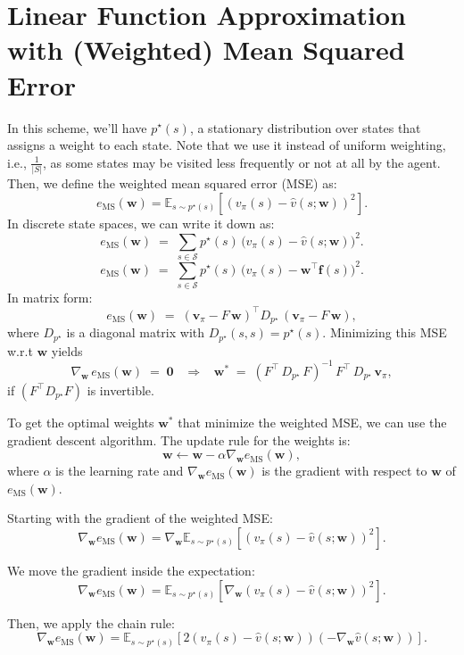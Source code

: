 \section{Linear Function Approximation with (Weighted) Mean Squared Error}

In this scheme, we'll have \(p^\star(s)\), a stationary distribution over states that assigns a weight to each state. Note that we use it instead of uniform weighting, i.e., \(\frac{1}{|S|}\), as some states may be visited less frequently or not at all by the agent. Then, we define the weighted mean squared error (MSE) as:
\[
e_{\text{MS}}(\mathbf{w}) 
= \mathbb{E}_{s \sim p^\star(s)}\left[\left(v_\pi(s) - \hat{v}(s;\mathbf{w})\right)^2\right].
\]
In discrete state spaces, we can write it down as:
\[
e_{\text{MS}}(\mathbf{w})
\;=\; \sum_{s \in \mathcal{S}} p^\star(s)\,\bigl(v_\pi(s) - \hat{v}(s;\mathbf{w})\bigr)^2.
\]
\[
e_{\text{MS}}(\mathbf{w})
\;=\; \sum_{s \in \mathcal{S}} p^\star(s)\,\bigl(v_\pi(s) - \mathbf{w}^\top \mathbf{f}(s)\bigr)^2.
\]
In matrix form:
\[
e_{\text{MS}}(\mathbf{w}) 
\;=\; (\mathbf{v}_\pi - F\,\mathbf{w})^\top D_{p^\star} \,(\mathbf{v}_\pi - F\,\mathbf{w}),
\]
where \(D_{p^\star}\) is a diagonal matrix with \(D_{p^\star}(s,s) = p^\star(s)\). Minimizing this MSE w.r.t \(\mathbf{w}\) yields
\[
\nabla_{\mathbf{w}}\, e_{\text{MS}}(\mathbf{w}) \;=\; \mathbf{0}
\;\;\;\Rightarrow\;\;\;
\mathbf{w}^*
\;=\; (F^\top\,D_{p^\star}\,F)^{-1}\,F^\top\,D_{p^\star}\,\mathbf{v}_\pi,
\]
if \((F^\top D_{p^\star} F)\) is invertible.

To get the optimal weights \(\mathbf{w}^*\) that minimize the weighted MSE, we can use the gradient descent algorithm. The update rule for the weights is:
\[
\mathbf{w} \leftarrow \mathbf{w} - \alpha \nabla_{\mathbf{w}} e_{\text{MS}}(\mathbf{w}),
\]
where \(\alpha\) is the learning rate and \(\nabla_{\mathbf{w}} e_{\text{MS}}(\mathbf{w})\) is the gradient with respect to \(\mathbf{w}\) of \(e_{\text{MS}}(\mathbf{w})\).

Starting with the gradient of the weighted MSE:
\[
\nabla_{\mathbf{w}} e_{\text{MS}}(\mathbf{w}) = \nabla_{\mathbf{w}} \mathbb{E}_{s \sim p^\star(s)}\left[\left(v_\pi(s) - \hat{v}(s;\mathbf{w})\right)^2\right].
\]

We move the gradient inside the expectation:
\[
\nabla_{\mathbf{w}} e_{\text{MS}}(\mathbf{w}) = \mathbb{E}_{s \sim p^\star(s)}\left[\nabla_{\mathbf{w}} \left(v_\pi(s) - \hat{v}(s;\mathbf{w})\right)^2\right].
\]

Then, we apply the chain rule:
\[
\nabla_{\mathbf{w}} e_{\text{MS}}(\mathbf{w}) = \mathbb{E}_{s \sim p^\star(s)}\left[2 \left(v_\pi(s) - \hat{v}(s;\mathbf{w})\right) \left(- \nabla_{\mathbf{w}} \hat{v}(s;\mathbf{w})\right)\right].
\]

